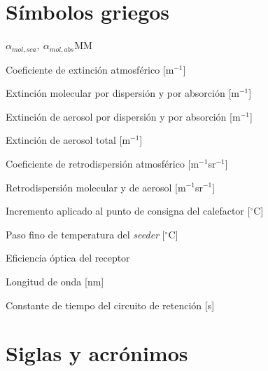 \section*{Símbolos griegos}

\begin{listasimbolos}{$\alpha_{mol,sca},\ \alpha_{mol,abs}$MM}
\item[$\alpha$] Coeficiente de extinción atmosférico [m$^{-1}$]
\item[$\alpha_{mol,sca},\ \alpha_{mol,abs}$] Extinción molecular por dispersión y por absorción [m$^{-1}$]
\item[$\alpha_{aer,sca},\ \alpha_{aer,abs}$] Extinción de aerosol por dispersión y por absorción [m$^{-1}$]
\item[$\alpha_{aer}$] Extinción de aerosol total [m$^{-1}$]
\item[$\beta$] Coeficiente de retrodispersión atmosférico [m$^{-1}$sr$^{-1}$]
\item[$\beta_{mol},\ \beta_{aer}$] Retrodispersión molecular y de aerosol [m$^{-1}$sr$^{-1}$]
\item[$\Delta_{\mathrm{heater}}$] Incremento aplicado al punto de consigna del calefactor [$^{\circ}$C]
\item[$\delta_f$] Paso fino de temperatura del \emph{seeder} [$^{\circ}$C]
\item[$\eta$] Eficiencia óptica del receptor
\item[$\lambda$] Longitud de onda [nm]
\item[$\tau$] Constante de tiempo del circuito de retención [s]
\end{listasimbolos}

\section*{Siglas y acrónimos}

